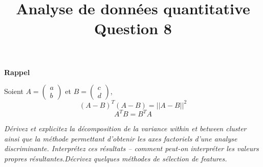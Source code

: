 \documentclass[a4paper, 11pt, onecolumn]{article}
\title{Analyse de données quantitative\\Question 8}
\date{}
\begin{document}
\maketitle

\begin{framed}
\textbf{Rappel}

Soient $A=\left(\begin{array}{l}a\\b\end{array}\right)$ et $B=\left(\begin{array}{l}c\\d\end{array}\right)$, 
$$(A-B)^T(A-B) = ||A-B||^2$$
$$A^TB = B^TA$$
\end{framed}

\textit{Dérivez et explicitez la décomposition de la variance within et between cluster ainsi que la méthode permettant d’obtenir les axes factoriels d’une analyse discriminante. Interprétez ces résultats – comment peut-on interpréter les valeurs propres résultantes.Décrivez quelques méthodes de sélection de features.}
\end{document}
